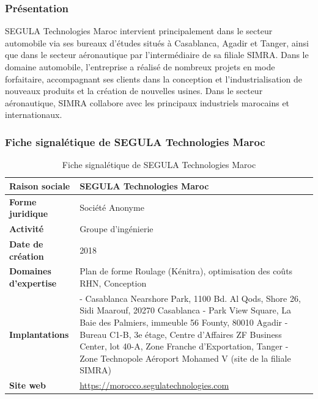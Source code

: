 \subsubsection{Présentation}
SEGULA Technologies Maroc intervient principalement dans le secteur automobile via ses bureaux d'études situés à Casablanca, Agadir et Tanger, ainsi que dans le secteur aéronautique par l'intermédiaire de sa filiale SIMRA. Dans le domaine automobile, l'entreprise a réalisé de nombreux projets en mode forfaitaire, accompagnant ses clients dans la conception et l'industrialisation de nouveaux produits et la création de nouvelles usines. Dans le secteur aéronautique, SIMRA collabore avec les principaux industriels marocains et internationaux.

\subsubsection{Fiche signalétique de SEGULA Technologies Maroc}
\begin{table}[h!]
    \centering
    \begin{tabular}{|p{4cm}|p{10cm}|}
        \hline
        \textbf{Raison sociale} & SEGULA Technologies Maroc \\ \hline
        \textbf{Forme juridique} & Société Anonyme \\ \hline
        \textbf{Activité} & Groupe d'ingénierie \\ \hline
        \textbf{Date de création} & 2018 \\ \hline
        \textbf{Domaines d'expertise} & Plan de forme Roulage (Kénitra), optimisation des coûts RHN, Conception \\ \hline
        \textbf{Implantations} & - Casablanca Nearshore Park, 1100 Bd. Al Qods, Shore 26, Sidi Maarouf, 20270 Casablanca \newline - Park View Square, La Baie des Palmiers, immeuble 56 Founty, 80010 Agadir \newline - Bureau C1-B, 3e étage, Centre d'Affaires ZF Business Center, lot 40-A, Zone Franche d'Exportation, Tanger \newline - Zone Technopole Aéroport Mohamed V (site de la filiale SIMRA) \\ \hline
        \textbf{Site web} & \url{https://morocco.segulatechnologies.com} \\ \hline
    \end{tabular}
    \caption{Fiche signalétique de SEGULA Technologies Maroc}
\end{table}


